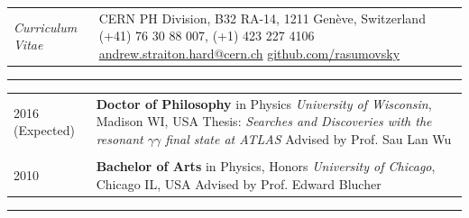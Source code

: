 \documentclass{letter}
\begin{document}
 

\begin{tabular}{p{}p{}}
	\hfill \newline \href{https://ch.linkedin.com/in/andrew-hard-25b690a5}{\Huge{\color{Maroon}{Andrew Hard}}} \newline \LARGE{\textit{Curriculum Vitae}} \newline
	&
	\hfill \newline CERN PH Division, B32 RA-14, 1211 Gen\`{e}ve, Switzerland \newline
	(+41) 76 30 88 007, (+1) 423 227 4106 \newline
	\href{mailto:ahard@cern.ch}{andrew.straiton.hard@cern.ch} \newline
	\href{https://github.com/rasumovsky}{github.com/rasumovsky}\\
\end{tabular}

\begin{flushleft}
\Large{\textsc{\textbf{\color{Maroon}{Education}}}}
\vspace{1pt} %
\hrule
\end{flushleft}

\begin{tabular}{p{}p{}}
	2016 (Expected)
	&
	\textbf{Doctor of Philosophy} in Physics \newline 
	\textit{University of Wisconsin}, Madison WI, USA \newline
	Thesis: \textit{Searches and Discoveries with the resonant $\gamma\gamma$ final state at ATLAS} \newline
	Advised by Prof. Sau Lan Wu \\
\\
	2010 
	& 
	\textbf{Bachelor of Arts} in Physics, Honors \newline 
	\textit{University of Chicago}, Chicago IL, USA \newline
	Advised by Prof. Edward Blucher 
\\
\end{tabular}

\begin{flushleft}
\Large{\textsc{\textbf{\color{Maroon}{Experience}}}}
\vspace{1pt} %
\hrule
\end{flushleft}
\end{document}
